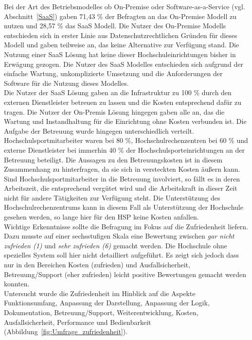 Bei der Art des Betriebsmodelles ob On-Premise oder Software-as-a-Service (vgl. Abschnitt~\ref{SaaS}) gaben 71,43 \% der Befragten an das On-Premise Modell zu nutzen und 28,57 \% das SaaS Modell. Die Nutzer des On-Premise Modells entschieden sich in erster Linie aus Datenschutzrechtlichen Gründen für dieses Modell und gaben teilweise an, das keine Alternative zur Verfügung stand. Die Nutzung einer SaaS Lösung hat keine dieser Hochschuleinrichtungen bisher in Erwägung gezogen. Die Nutzer des SaaS Modelles entschieden sich aufgrund der einfache Wartung, unkomplizierte Umsetzung und die Anforderungen der Software für die Nutzung dieses Modelles.
\\
Die Nutzer der SaaS Lösung gaben an die Infrastruktur zu 100 \% durch den externen Dienstleister betreuen zu lassen und die Kosten entsprechend dafür zu tragen. Die Nutzer der On-Premis Lösung hingegen gaben alle an, das die Wartung und Instandhaltung für die Einrichtung ohne Kosten verbunden ist. Die Aufgabe der Betreuung wurde hingegen unterschiedlich verteilt. Hochschulsportmitarbeiter waren bei 80 \%, Hochschulrechenzentren bei 60 \% und externe Dienstleister bei immerhin 40 \% der Hochschulsporteinrichtungen an der Betreuung beteiligt. Die Aussagen zu den Betreuungskosten ist in diesem Zusammenhang zu hinterfragen, da sie sich in versteckten Kosten äußern kann. Sind Hochschulsportmitarbeiter in die Betreuung involviert, so fällt es in deren Arbeitszeit, die entsprechend vergütet wird und die Arbeitskraft in dieser Zeit nicht für andere Tätigkeiten zur Verfügung steht. Die Unterstützung des Hochschulrechenzentrums kann in diesem Fall als Unterstützung der Hochschule gesehen werden, so lange hier für den HSP keine Kosten anfallen.
\\

Wichtige Erkenntnisse sollte die Befragung im Fokus auf die Zufriedenheit liefern. Dazu musste auf einer sechsstufigen Skala eine Bewertung zwischen \textit{gar nicht zufrieden (1)} und \textit{sehr zufrieden (6)} gemacht werden. Die Hochschule ohne spezielles System soll hier nicht detailliert aufgeführt. Es zeigt sich jedoch dass nur in den Bereichen Kosten (zufrieden) und Ausfallsicherheit, Betreuung/Support (eher zufrieden) leicht positive Bewertungen gemacht werden konnten. 
\\
Untersucht wurde die Zufriedenheit im Hinblick auf die Aspekte Funktionsumfang, Anpassung der Darstellung, Anpassung der Logik, Dokumentation, Betreuung/Support, Weiterentwicklung, Kosten, Ausfallsicherheit, Performance und Bedienbarkeit (Abbildung~\ref{fig:Umfrage_zufriedenheit}).

